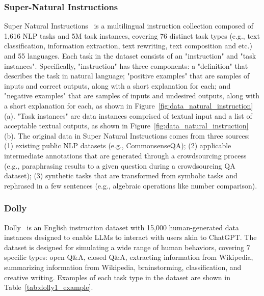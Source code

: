 \documentclass[11pt]{article}
\begin{document}
\subsubsection{Super-Natural Instructions}

Super Natural Instructions~\citep{supernaturalinstructions} is a multilingual instruction collection composed of 1,616 NLP tasks and 5M task instances, covering 76 distinct task types (e.g., text classification, information extraction, text rewriting, text composition and etc.) and 55 languages. Each task in the dataset consists of an "instruction" and "task instances". Specifically, "instruction" has three components: a "definition" that describes the task in natural language; "positive examples" that are samples of inputs and correct outputs, along with a short explanation for each; and "negative examples" that are samples of inputs and undesired outputs, along with a short explanation for each, as shown in Figure~\ref{fig:data_natural_instruction}  (a). 
 "Task instances" are data instances comprised of textual input and a list of acceptable textual outputs, as shown in Figure~\ref{fig:data_natural_instruction}  (b).
The original data in Super Natural Instructions comes from three sources: (1) existing public NLP datasets (e.g., CommonsenseQA); (2) applicable intermediate annotations that are generated through a crowdsourcing process (e.g., paraphrasing results to a given question during a crowdsourcing QA dataset); (3) synthetic tasks that are transformed from symbolic tasks and rephrased in a few sentences (e.g., algebraic operations like number comparison).

\subsubsection{Dolly}

Dolly~\citep{conover2023free} is an English instruction dataset with 15,000 human-generated data instances designed to enable LLMs to interact with users akin to ChatGPT. 
The dataset is designed for simulating a wide range of human behaviors, covering 7 specific types: open Q\&A, closed Q\&A, extracting information from Wikipedia, summarizing information from Wikipedia, brainstorming, classification, and creative writing. Examples of each task type in the dataset are shown in Table~\ref{tab:dolly1_example}. 
\end{document}

